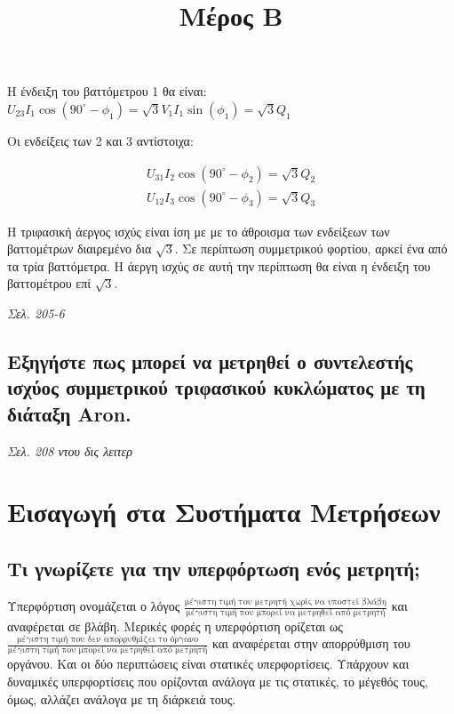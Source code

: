 \documentclass{article}
\begin{document}
Η ένδειξη του βαττόμετρου 1 θα είναι: $U_{23}I_1\cos(90^\circ - \phi_1) = \sqrt{3}V_1I_1\sin(\phi_1) = \sqrt{3}Q_1$
\newpage

Οι ενδείξεις των 2 και 3 αντίστοιχα:

\begin{align*}
    U_{31}I_2\cos(90^\circ - \phi_2)=\sqrt3Q_2 \\
    U_{12}I_3\cos(90^\circ - \phi_3)=\sqrt3Q_3
\end{align*}

Η τριφασική άεργος ισχύς είναι ίση με με το άθροισμα των ενδείξεων των βαττομέτρων διαιρεμένο δια $\sqrt{3}$. Σε περίπτωση συμμετρικού φορτίου, αρκεί ένα από τα τρία βαττόμετρα. Η άεργη ισχύς σε αυτή την περίπτωση θα είναι η ένδειξη του βαττομέτρου επί $\sqrt{3}$.

\emph{Σελ. 205-6}
\subsection{Εξηγήστε πως μπορεί να μετρηθεί ο συντελεστής ισχύος συμμετρικού τριφασικού κυκλώματος με τη διάταξη \foreignlanguage{english}{Aron}.}
\emph{Σελ. 208 ντου δις λειτερ}


\title{Μέρος Β}

\maketitle

\section{Εισαγωγή στα Συστήματα Μετρήσεων}
\subsection{Τι γνωρίζετε για την υπερφόρτωση ενός μετρητή;}
Υπερφόρτιση ονομάζεται ο λόγος $\frac{\text{μέγιστη τιμή του μετρητή χωρίς να υποστεί βλάβη}}{\text{μέγιστη τιμή που μπορεί να μετρηθεί από μετρητή}}$ και αναφέρεται σε βλάβη. 
Μερικές φορές η υπερφόρτιση ορίζεται ως $\frac{\text{μέγιστη τιμή που δεν απορρυθμίζει το όργανο}}{\text{μέγιστη τιμή που μπορεί να μετρηθεί από μετρητή}}$ και αναφέρεται 
στην απορρύθμιση του οργάνου. Και οι δύο περιπτώσεις είναι στατικές υπερφορτίσεις. Υπάρχουν και δυναμικές υπερφορτίσεις που ορίζονται ανάλογα με τις στατικές, το μέγεθός
τους, όμως, αλλάζει ανάλογα με τη διάρκειά τους.
\end{document}

